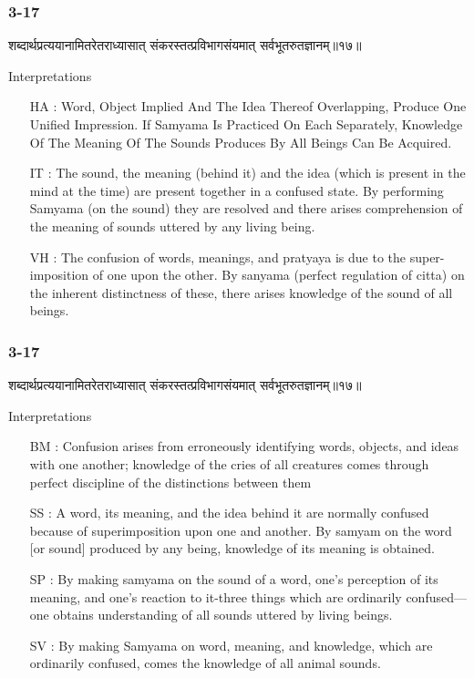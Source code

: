 \begin{frame}[fragile]\frametitle{3-17}
\begin{sanskrit}
शब्दार्थप्रत्ययानामितरेतराध्यासात् संकरस्तत्प्रविभागसंयमात् सर्वभूतरुतज्ञानम्॥१७॥
\end{sanskrit}

Interpretations
\begin{itemize}	
\item [HA]: Word, Object Implied And The Idea Thereof Overlapping, Produce One Unified Impression. If Samyama Is Practiced On Each Separately, Knowledge Of The Meaning Of The Sounds Produces By All Beings Can Be Acquired.
\item [IT]: The sound, the meaning (behind it) and the idea (which is present in the mind at the time) are present together in a confused state. By performing Samyama (on the sound) they are resolved and there arises comprehension of the meaning of sounds uttered by any living being.
\item [VH]: The confusion of words, meanings, and pratyaya is due to the super-imposition of one upon the other. By sanyama (perfect regulation of citta) on the inherent distinctness of these, there arises knowledge of the sound of all beings.
\end{itemize}
\end{frame}

\begin{frame}[fragile]\frametitle{3-17}
\begin{sanskrit}
शब्दार्थप्रत्ययानामितरेतराध्यासात् संकरस्तत्प्रविभागसंयमात् सर्वभूतरुतज्ञानम्॥१७॥
\end{sanskrit}

Interpretations
\begin{itemize}	
\item [BM]: Confusion arises from erroneously identifying words, objects, and ideas with one another; knowledge of the cries of all creatures comes through perfect discipline of the distinctions between them
\item [SS]: A word, its meaning, and the idea behind it are normally confused because of superimposition upon one and another. By samyam on the word [or sound] produced by any being, knowledge of its meaning is obtained.
\item [SP]: By making samyama on the sound of a word, one’s perception of its meaning, and one’s reaction to it-three things which are ordinarily confused—one obtains understanding of all sounds uttered by living beings.
\item [SV]: By making Samyama on word, meaning, and knowledge, which are ordinarily confused, comes the knowledge of all animal sounds. 
\end{itemize}
\end{frame}

